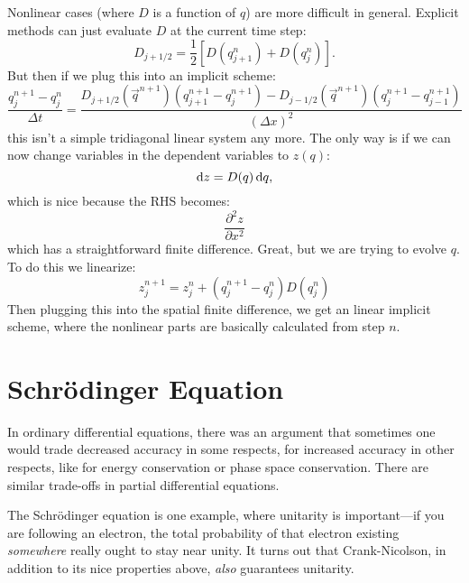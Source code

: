 Nonlinear cases (where $D$ is a function of $q$) are more
difficult in general. Explicit methods can just evaluate $D$ at the
current time step:
\begin{equation}
 D_{j+1/2} = \frac{1}{2}\left[D\left(q_{j+1}^n\right) +
 D\left(q_j^n\right)\right].
\end{equation}
But then if we plug this into an implicit scheme:
\begin{equation}
 \frac{q_j^{n+1} - q_j^n}{\Delta t}
  = \frac{D_{j+1/2}\left(\vec{q}^{n+1}\right) \left(q_{j+1}^{n+1} - q_{j}^{n+1}\right) -
  D_{j-1/2}\left(\vec{q}^{n+1}\right) \left(q_j^{n+1} - q_{j-1}^{n+1}\right)}{(\Delta x)^2}
\end{equation}
this isn't a simple tridiagonal linear system any more.  The only way
is if we can now change variables in the dependent variables to
$z(q)$:
\begin{equation}
{\rm d}z = D(q) \,{\rm d}q, 
\end{equation}
which is nice because the RHS becomes:
\begin{equation}
\frac{\partial^2 z}{\partial x^2}
\end{equation}
which has a straightforward finite difference.  Great, but we are
trying to evolve $q$. To do this we linearize:
\begin{equation}
 z_j^{n+1} = z_j^n + \left(q_j^{n+1} - q_j^{n}\right) D\left(q_j^n\right)
\end{equation}
Then plugging this into the spatial finite difference, we get an
linear implicit scheme, where the nonlinear parts are basically
calculated from step $n$.

\section{Schr\"odinger Equation}

In ordinary differential equations, there was an argument that
sometimes one would trade decreased accuracy in some respects, for
increased accuracy in other respects, like for energy conservation or
phase space conservation. There are similar trade-offs in partial
differential equations.

The Schr\"odinger equation is one example, where unitarity is
important---if you are following an electron, the total probability of
that electron existing {\it somewhere} really ought to stay near
unity.  It turns out that Crank-Nicolson, in addition to its nice
properties above, {\it also} guarantees unitarity.

